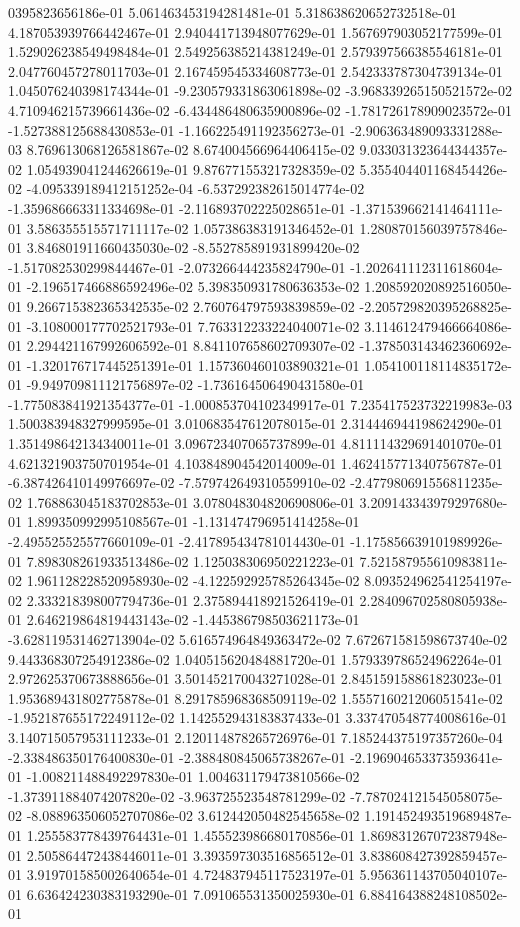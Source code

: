 0395823656186e-01	5.061463453194281481e-01	5.318638620652732518e-01	4.187053939766442467e-01	2.940441713948077629e-01	1.567697903052177599e-01	1.529026238549498484e-01	2.549256385214381249e-01	2.579397566385546181e-01	2.047760457278011703e-01	2.167459545334608773e-01	2.542333787304739134e-01	1.045076240398174344e-01	-9.230579331863061898e-02	-3.968339265150521572e-02	4.710946215739661436e-02	-6.434486480635900896e-02	-1.781726178909023572e-01	-1.527388125688430853e-01	-1.166225491192356273e-01	-2.906363489093331288e-03	8.769613068126581867e-02	8.674004566964406415e-02	9.033031323644344357e-02	1.054939041244626619e-01	9.876771553217328359e-02	5.355404401168454426e-02	-4.095339189412151252e-04	-6.537292382615014774e-02	-1.359686663311334698e-01	-2.116893702225028651e-01	-1.371539662141464111e-01	3.586355515571711117e-02	1.057386383191346452e-01	1.280870156039757846e-01	3.846801911660435030e-02	-8.552785891931899420e-02	-1.517082530299844467e-01	-2.073266444235824790e-01	-1.202641112311618604e-01	-2.196517466886592496e-02	5.398350931780636353e-02	1.208592020892516050e-01	9.266715382365342535e-02	2.760764797593839859e-02	-2.205729820395268825e-01	-3.108000177702521793e-01	7.763312233224040071e-02	3.114612479466664086e-01	2.294421167992606592e-01	8.841107658602709307e-02	-1.378503143462360692e-01	-1.320176717445251391e-01	1.157360460103890321e-01	1.054100118114835172e-01	-9.949709811121756897e-02	-1.736164506490431580e-01	-1.775083841921354377e-01	-1.000853704102349917e-01	7.235417523732219983e-03	1.500383948327999595e-01	3.010683547612078015e-01	2.314446944198624290e-01	1.351498642134340011e-01	3.096723407065737899e-01	4.811114329691401070e-01	4.621321903750701954e-01	4.103848904542014009e-01	1.462415771340756787e-01	-6.387426410149976697e-02	-7.579742649310559910e-02	-2.477980691556811235e-02	1.768863045183702853e-01	3.078048304820690806e-01	3.209143343979297680e-01	1.899350992995108567e-01	-1.131474796951414258e-01	-2.495525525577660109e-01	-2.417895434781014430e-01	-1.175856639101989926e-01	7.898308261933513486e-02	1.125038306950221223e-01	7.521587955610983811e-02	1.961128228520958930e-02	-4.122592925785264345e-02	8.093524962541254197e-02	2.333218398007794736e-01	2.375894418921526419e-01	2.284096702580805938e-01	2.646219864819443143e-02	-1.445386798503621173e-01	-3.628119531462713904e-02	5.616574964849363472e-02	7.672671581598673740e-02	9.443368307254912386e-02	1.040515620484881720e-01	1.579339786524962264e-01	2.972625370673888656e-01	3.501452170043271028e-01	2.845159158861823023e-01	1.953689431802775878e-01	8.291785968368509119e-02	1.555716021206051541e-02	-1.952187655172249112e-02	1.142552943183837433e-01	3.337470548774008616e-01	3.140715057953111233e-01	2.120114878265726976e-01	7.185244375197357260e-04	-2.338486350176400830e-01	-2.388480845065738267e-01	-2.196904653373593641e-01	-1.008211488492297830e-01	1.004631179473810566e-02	-1.373911884074207820e-02	-3.963725523548781299e-02	-7.787024121545058075e-02	-8.088963506052707086e-02	3.612442050482545658e-02	1.191452493519689487e-01	1.255583778439764431e-01	1.455523986680170856e-01	1.869831267072387948e-01	2.505864472438446011e-01	3.393597303516856512e-01	3.838608427392859457e-01	3.919701585002640654e-01	4.724837945117523197e-01	5.956361143705040107e-01	6.636424230383193290e-01	7.091065531350025930e-01	6.884164388248108502e-01